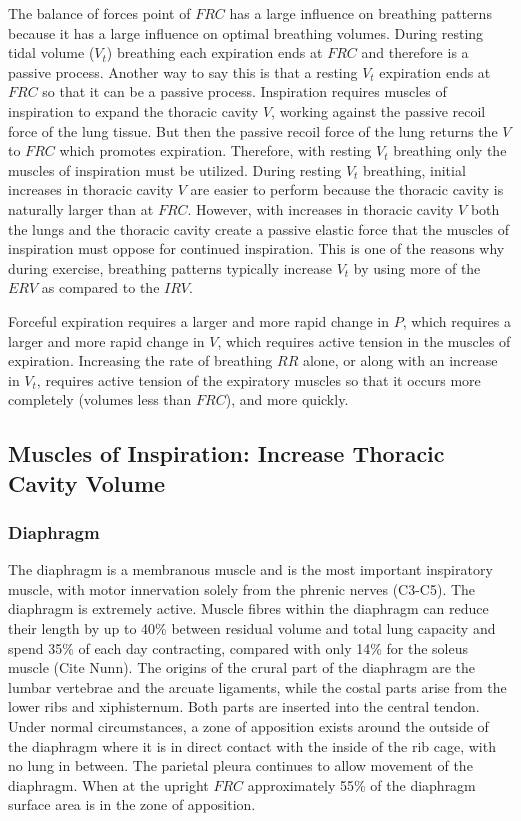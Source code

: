 The balance of forces point of $FRC$ has a large influence on breathing patterns because it has a large influence on optimal breathing volumes. During resting tidal volume ($V_t$) breathing each expiration ends at $FRC$ and therefore is a passive process. Another way to say this is that a resting $V_t$ expiration ends at $FRC$ so that it can be a passive process. Inspiration requires muscles of inspiration to expand the thoracic cavity $V$, working against the passive recoil force of the lung tissue. But then the passive recoil force of the lung returns the $V$ to $FRC$ which promotes expiration. Therefore, with resting $V_t$ breathing only the muscles of inspiration must be utilized. 
During resting $V_t$ breathing, initial increases in thoracic cavity $V$ are easier to perform because the thoracic cavity is naturally larger than at $FRC$. However, with increases in thoracic cavity $V$ both the lungs and the thoracic cavity create a passive elastic force that the muscles of inspiration must oppose for continued inspiration. This is one of the reasons why during exercise, breathing patterns typically increase $V_t$ by using more of the $ERV$ as compared to the $IRV$.

Forceful expiration requires a larger and more rapid change in $P$, which requires a larger and more rapid change in $V$, which requires active tension in the muscles of expiration. Increasing the rate of breathing $RR$ alone, or along with an increase in $V_t$, requires active tension of the expiratory muscles so that it occurs more completely (volumes less than $FRC$), and more quickly. 

\subsection{Muscles of Inspiration: Increase Thoracic Cavity Volume}

\subsubsection{Diaphragm}

The diaphragm is a membranous muscle and is the most important inspiratory muscle, with motor innervation solely from the phrenic nerves (C3-C5). The diaphragm is extremely active. Muscle fibres within the diaphragm can reduce their length by up to 40\% between residual volume and total lung capacity and spend 35\% of each day contracting, compared with only 14\% for the soleus muscle (Cite Nunn). The origins of the crural part of the diaphragm are the lumbar vertebrae and the arcuate ligaments, while the costal parts arise from the lower ribs and xiphisternum. Both parts are inserted into the central tendon. 
Under normal circumstances, a zone of apposition exists around the outside of the diaphragm where it is in direct contact with the inside of the rib cage, with no lung in between. The parietal pleura continues to allow movement of the diaphragm. When at the upright $FRC$ approximately 55\% of the diaphragm surface area is in the zone of apposition.

